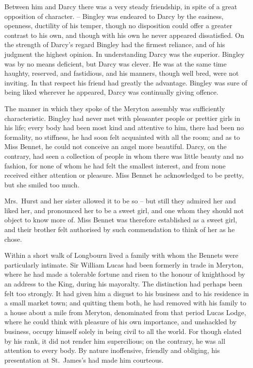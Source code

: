 Between him and Darcy there was a very steady
friendship, in spite of a great opposition of character. --
Bingley was endeared to Darcy by the easiness, openness,
ductility of his temper, though no disposition could offer
a greater contrast to his own, and though with his own he
never appeared dissatisfied. On the strength of Darcy’s
regard Bingley had the firmest reliance, and of his judgment
the highest opinion. In understanding Darcy was
the superior. Bingley was by no means deficient, but
Darcy was clever. He was at the same time haughty,
reserved, and fastidious, and his manners, though well
bred, were not inviting. In that respect his friend had
greatly the advantage. Bingley was sure of being liked
wherever he appeared, Darcy was continually giving
offence.

The manner in which they spoke of the Meryton
assembly was sufficiently characteristic. Bingley had
never met with pleasanter people or prettier girls in his
life; every body had been most kind and attentive to
him, there had been no formality, no stiffness, he had
soon felt acquainted with all the room; and as to Miss
Bennet, he could not conceive an angel more beautiful.
Darcy, on the contrary, had seen a collection of people
in whom there was little beauty and no fashion, for none
of whom he had felt the smallest interest, and from none
received either attention or pleasure. Miss Bennet he
acknowledged to be pretty, but she smiled too much.

Mrs.\ Hurst and her sister allowed it to be so -- but still
they admired her and liked her, and pronounced her to
be a sweet girl, and one whom they should not object to
know more of. Miss Bennet was therefore established as
a sweet girl, and their brother felt authorised by such
commendation to think of her as he chose.


Within a short walk of Longbourn lived a family with
whom the Bennets were particularly intimate. Sir William
Lucas had been formerly in trade in Meryton, where he had
made a tolerable fortune and risen to the honour of knighthood
by an address to the King, during his mayoralty. The
distinction had perhaps been felt too strongly. It had given
him a disgust to his business and to his residence in a small
market town; and quitting them both, he had removed
with his family to a house about a mile from Meryton,
denominated from that period Lucas Lodge, where he
could think with pleasure of his own importance, and
unshackled by business, occupy himself solely in being
civil to all the world. For though elated by his rank,
it did not render him supercilious; on the contrary, he
was all attention to every body. By nature inoffensive,
friendly and obliging, his presentation at St.\ James’s had
made him courteous.

